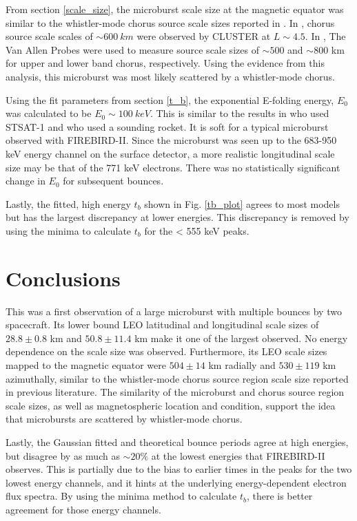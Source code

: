 \documentclass[draft,linenumbers]{agujournal}
\begin{document}
From section \ref{scale_size}, the microburst scale size at the magnetic equator was similar to the whistler-mode chorus source scale sizes reported in \citet{Agapitov2011b, Agapitov2017a}. In \citet{Agapitov2011b}, chorus source scale scales of $\sim 600 \ km$ were observed by CLUSTER at $L \sim 4.5$. In \citet{Agapitov2017a}, The Van Allen Probes were used to measure source scale sizes of $\sim 500$ and $\sim 800$ km for upper and lower band chorus, respectively. Using the evidence from this analysis, this microburst was most likely scattered by a whistler-mode chorus.

Using the fit parameters from section \ref{t_b}, the exponential E-folding energy, $E_0$ was calculated to be $E_0 \sim 100 \ keV$. This is similar to the results in \citet{Lee2005} who used STSAT-1 and \citet{Datta1997} who used a sounding rocket. It is soft for a typical microburst observed with FIREBIRD-II. Since the microburst was seen up to the 683-950 keV energy channel on the surface detector, a more realistic longitudinal scale size may be that of the 771 keV electrons. There was no statistically significant change in $E_0$ for subsequent bounces.

Lastly, the fitted, high energy $t_b$ shown in Fig. \ref{tb_plot} agrees to most models but has the largest discrepancy at lower energies. This discrepancy is removed by using the minima to calculate $t_b$ for the < 555 keV peaks.

\section{Conclusions}
This was a first observation of a large microburst with multiple bounces by two spacecraft. Its lower bound LEO latitudinal and longitudinal scale sizes of $28.8 \pm 0.8$ km and $ 50.8 \pm 11.4$  km make it one of the largest observed. No energy dependence on the scale size was observed. Furthermore, its LEO scale sizes mapped to the magnetic equator were  $504 \pm​ 14$ km radially and $530 \pm 119$ km azimuthally, similar to the whistler-mode chorus source region scale size reported in previous literature. The similarity of the microburst and chorus source region scale sizes, as well as magnetospheric location and condition, support the idea that microbursts are scattered by whistler-mode chorus.

Lastly, the Gaussian fitted and theoretical bounce periods agree at high energies, but disagree by as much as $\sim 20 \%$ at the lowest energies that FIREBIRD-II observes. This is partially due to the bias to earlier times in the peaks for the two lowest energy channels, and it hints at the underlying energy-dependent electron flux spectra. By using the minima method to calculate $t_b$, there is better agreement for those energy channels. 
\end{document}
